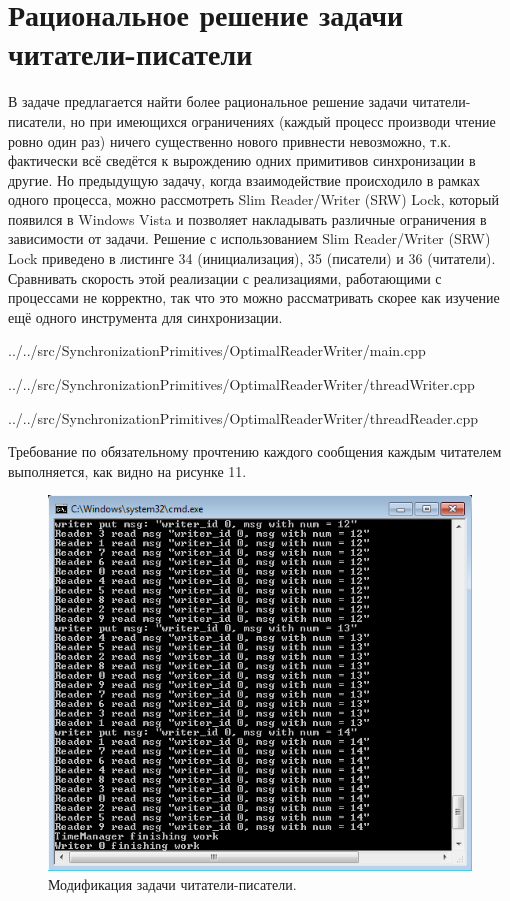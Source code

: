 \documentclass[a4paper, 12pt]{article}		%
\begin{document}
\newpage
\section{Рациональное решение задачи читатели-писатели}

В задаче предлагается найти более рациональное решение задачи читатели-писатели, но при имеющихся ограничениях (каждый процесс производи чтение ровно один раз) ничего существенно нового привнести невозможно, т.к. фактически всё сведётся к вырождению одних примитивов синхронизации в другие. Но предыдущую задачу, когда взаимодействие происходило в рамках одного процесса, можно рассмотреть Slim Reader/Writer (SRW) Lock, который появился в Windows Vista и позволяет накладывать различные ограничения в зависимости от задачи.
Решение с использованием Slim Reader/Writer (SRW) Lock приведено в листинге 34 (инициализация), 35 (писатели) и 36 (читатели). Сравнивать скорость этой реализации с реализациями, работающими с процессами не корректно, так что это можно рассматривать скорее как изучение ещё одного инструмента для синхронизации.


{../../src/SynchronizationPrimitives/OptimalReaderWriter/main.cpp}
\newpage


{../../src/SynchronizationPrimitives/OptimalReaderWriter/threadWriter.cpp}
\newpage


{../../src/SynchronizationPrimitives/OptimalReaderWriter/threadReader.cpp}
\newpage

Требование по обязательному прочтению каждого сообщения каждым читателем выполняется, как видно на рисунке 11.

\begin{figure}[h!]
\centering
\includegraphics[scale=0.9]{res/011}
\caption{Модификация задачи читатели-писатели.}
\end{figure}
\end{document}
